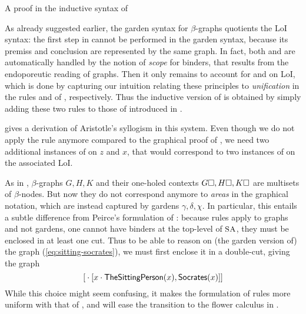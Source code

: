 \begin{marginfigure}
  
  \caption{A proof in the inductive syntax of }
\end{marginfigure}

As already suggested earlier, the garden syntax for $\beta$-graphs quotients the
LoI syntax: the first  step in 
cannot be performed in the garden syntax, because its premiss and conclusion are
represented by the same graph. In fact, both  and
 are automatically handled by the notion of \emph{scope} for
binders, that results from the endoporeutic reading of graphs. Then it only
remains to account for  and  on LoI, which is done
by capturing our intuition relating these principles to \emph{unification} in
the rules  and  of , respectively.
Thus the inductive version of  is obtained by simply adding these two
rules to those of  introduced in .

 gives a derivation of Aristotle's syllogism
in this system. Even though we do not apply the  rule anymore compared
to the graphical proof of , we need two additional
instances of  on $z$ and $x$, that would correspond to two
instances of  on the associated LoI.

\begin{remark}
  As in , $\beta$-graphs $G, H, K$ and their one-holed contexts
  $G\square, H\square, K\square$ are multisets of $\beta$-nodes. But now they do not
  correspond anymore to \emph{areas} in the graphical notation, which are
  instead captured by gardens $\gamma, \delta, \chi$. In particular, this
  entails a subtle difference from Peirce's formulation of : because
  rules apply to graphs and not gardens, one cannot have binders at the
  top-level of $\small\textsc{SA}$, they must be enclosed in at least one cut. Thus to be able
  to reason on (the garden version of) the graph (\ref{eq:sitting-socrates}), we
  must first enclose it in a double-cut, giving the graph
  $$[{} \cdot [x \cdot \mathsf{TheSittingPerson}(x),\mathsf{Socrates}(x)]]$$
  While this choice might seem confusing, it makes the formulation of rules more
  uniform with that of , and will ease the transition to the flower
  calculus in .
\end{remark}

